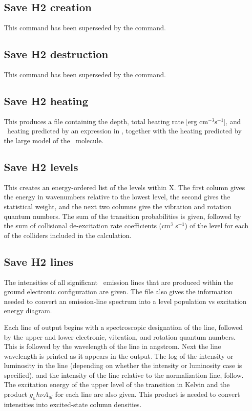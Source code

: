 \subsection{Save H2 creation}

This command has been superseded by the  command.

\subsection{Save H2 destruction}

This command has been superseded by the  command.

\subsection{Save H2 heating}

This produces a file containing the depth, total heating rate [erg
cm$^{-3}\mathrm{s}^{-1}$], and \htwo\ heating predicted by an expression in \citet{Tielens1985a}, together with the heating predicted by the large model of the \htwo\ molecule.

\subsection{Save H2 levels}

This creates an energy-ordered list of the levels within X.  The first
column gives the energy in wavenumbers relative to the lowest level, the
second gives the statistical weight, and the next two columns give the
vibration and rotation quantum numbers.  The sum of the transition
probabilities is given, followed by the sum of collisional de-excitation rate
coefficients (cm$^{3}$ s$^{-1}$) of the level for each of the colliders 
included in the calculation.

\subsection{Save H2 lines}

The intensities of all significant \htwo\ emission lines that are produced
within the ground electronic configuration are given.  The file also gives the
information needed to convert an emission-line spectrum into a level
population vs excitation energy diagram.

Each line of output begins with a spectroscopic designation of the line,
followed by the upper and lower electronic, vibration, and rotation quantum
numbers.
This is followed by the wavelength of the line in angstrom.
Next the
line wavelength is printed as it appears in the output.
The log of
the intensity or luminosity in the line (depending on whether the intensity
or luminosity case is specified), and the intensity of the line relative
to the normalization line, follow.
The excitation energy of the upper
level of the transition in Kelvin and the product
$g_u h\nu A_{ul} $  for each line are also given.
This product is needed to convert
intensities into excited-state column densities.

